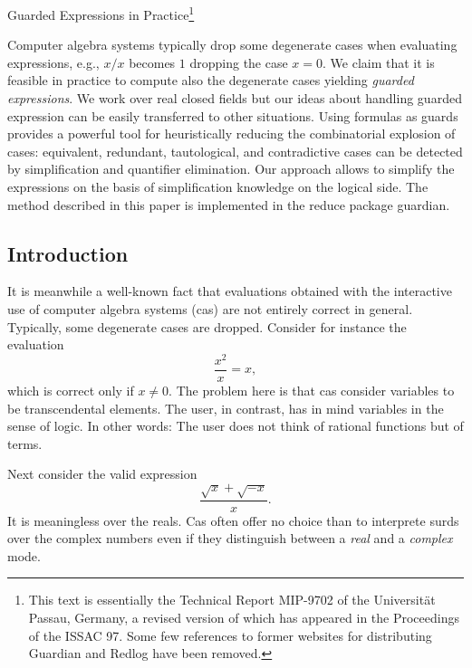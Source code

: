 
\newenvironment{gex}{\left[\begin{array}{c|c}}{\end{array}\right]}
\newcommand{\gc}[1]{\mbox{\boldmath$#1$}}
\newcommand{\true}{{\rm T}}
\newcommand{\false}{{\rm F}}
\newcommand{\E}{{\rm E}}
\newcommand{\GE}{{\rm GE}}
\newcommand{\gscheme}{{\rm gscheme}}
\newcommand{\sign}{{\rm sign}}

Guarded Expressions in Practice\thanks{This text is essentially
    the Technical Report MIP-9702 of the Universit\"at Passau, Germany,
    a revised version of which has appeared in the Proceedings of the
    ISSAC 97. Some few references to former websites for distributing
    Guardian and Redlog have been removed.}%

%
Computer algebra systems typically drop some degenerate cases when
evaluating expressions, e.g., $x/x$ becomes $1$ dropping the case
$x=0$. We claim that it is feasible in practice to compute also the
degenerate cases yielding {\em guarded expressions}. We work over real
closed fields but our ideas about handling guarded expression can be
easily transferred to other situations. Using formulas as guards
provides a powerful tool for heuristically reducing the combinatorial
explosion of cases: equivalent, redundant, tautological, and
contradictive cases can be detected by simplification and quantifier
elimination. Our approach allows to simplify the expressions on the
basis of simplification knowledge on the logical side. The method
described in this paper is implemented in the {\sc reduce} package
{\sc guardian}.
%
\subsection{Introduction}
It is meanwhile a well-known fact that evaluations obtained with the
interactive use of computer algebra systems ({\sc cas}) are not
entirely correct in general. Typically, some degenerate cases are
dropped. Consider for instance the evaluation
$$
\frac{x^2}{x}=x,
$$
which is correct only if $x\neq0$.
The problem here is that {\sc cas} consider variables to be
transcendental elements. The user, in contrast, has in mind variables
in the sense of logic. In other words: The user does not think of
rational functions but of terms.

Next consider the valid expression
$$
\frac{\sqrt{x}+\sqrt{-x}}{x}.
$$
It is meaningless over the reals. {\sc Cas} often offer no choice than
to interprete surds over the complex numbers even if they distinguish
between a {\em real} and a {\em complex} mode.

